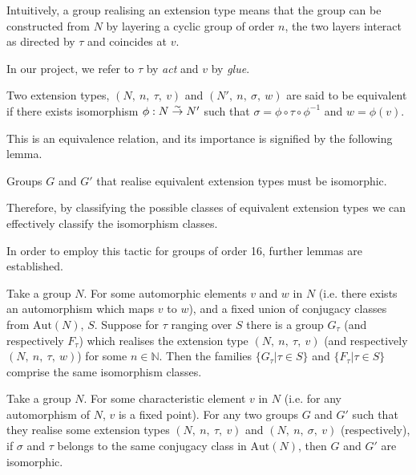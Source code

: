 Intuitively, a group realising an extension type means that the group can be constructed from $N$ by layering a cyclic group of order $n$, the two layers interact as directed by $\tau$ and coincides at $v$.

In our project, we refer to $\tau$ by \textit{act} and $v$ by \textit{glue}.

\begin{definition}[Wild]
    Two extension types, $(N,\ n,\ \tau,\ v)$ and $(N',\ n,\ \sigma,\ w)$ are said to be equivalent if there exists isomorphism $\phi : N \isom N'$ such that $\sigma = \phi \circ \tau \circ \phi^{-1}$ and $w = \phi(v)$.
\end{definition}

This is an equivalence relation, and its importance is signified by the following lemma.

\begin{lemma}[Wild]
    Groups $G$ and $G'$ that realise equivalent extension types must be isomorphic.
\end{lemma}

Therefore, by classifying the possible classes of equivalent extension types we can effectively classify the isomorphism classes.

In order to employ this tactic for groups of order 16, further lemmas are established.

\begin{lemma}[Wild]
    Take a group $N$.
    For some automorphic elements $v$ and $w$ in $N$ (i.e. there exists an automorphism which maps $v$ to $w$), and a fixed union of conjugacy classes from $\text{Aut}(N)$, $S$.
    Suppose for $\tau$ ranging over $S$ there is a group $G_\tau$ (and respectively $F_\tau$) which realises the extension type $(N,\ n,\ \tau,\ v)$ (and respectively $(N,\ n,\ \tau,\ w)$) for some $n \in \mathbb{N}$.
    Then the families $\{G_\tau | \tau \in S\}$ and $\{F_\tau | \tau \in S\}$ comprise the same isomorphism classes.
\end{lemma}

\begin{lemma}[Wild]
    Take a group $N$.
    For some characteristic element $v$ in $N$ (i.e. for any automorphism of $N$, $v$ is a fixed point).
    For any two groups $G$ and $G'$ such that they realise some extension types $(N,\ n,\ \tau,\ v)$ and $(N,\ n,\ \sigma,\ v)$ (respectively), if $\sigma$ and $\tau$ belongs to the same conjugacy class in $\text{Aut}(N)$, then $G$ and $G'$ are isomorphic.
\end{lemma}

